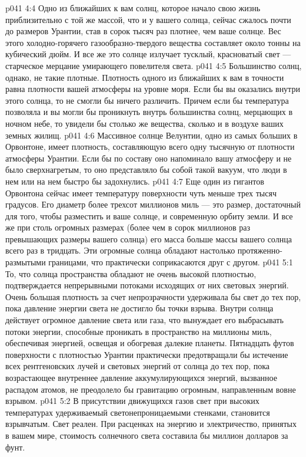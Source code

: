 \vs p041 4:4 Одно из ближайших к вам солнц, которое начало свою жизнь приблизительно с той же массой, что и у вашего солнца, сейчас сжалось почти до размеров Урантии, став в сорок тысяч раз плотнее, чем ваше солнце. Вес этого холодно\hyp{}горячего газообразно\hyp{}твердого вещества составляет около тонны на кубический дюйм. И все же это солнце излучает тусклый, красноватый свет --- старческое мерцание умирающего повелителя света.
\vs p041 4:5 Большинство солнц, однако, не такие плотные. Плотность одного из ближайших к вам в точности равна плотности вашей атмосферы на уровне моря. Если бы вы оказались внутри этого солнца, то не смогли бы ничего различить. Причем если бы температура позволяла и вы могли бы проникнуть внутрь большинства солнц, мерцающих в ночном небе, то увидели бы столько же вещества, сколько и в воздухе ваших земных жилищ.
\vs p041 4:6 Массивное солнце Велунтии, одно из самых больших в Орвонтоне, имеет плотность, составляющую всего одну тысячную от плотности атмосферы Урантии. Если бы по составу оно напоминало вашу атмосферу и не было сверхнагретым, то оно представляло бы собой такой вакуум, что люди в нем или на нем быстро бы задохнулись.
\vs p041 4:7 Еще один из гигантов Орвонтона сейчас имеет температуру поверхности чуть меньше трех тысяч градусов. Его диаметр более трехсот миллионов миль --- это размер, достаточный для того, чтобы разместить и ваше солнце, и современную орбиту земли. И все же при столь огромных размерах (более чем в сорок миллионов раз превышающих размеры вашего солнца) его масса больше массы вашего солнца всего раз в тридцать. Эти огромные солнца обладают настолько протяженно\hyp{}размытыми границами, что практически соприкасаются друг с другом.
\vs p041 5:1 То, что солнца пространства обладают не очень высокой плотностью, подтверждается непрерывными потоками исходящих от них световых энергий. Очень большая плотность за счет непрозрачности удерживала бы свет до тех пор, пока давление энергии света не достигло бы точки взрыва. Внутри солнца действует огромное давление света или газа, что вынуждает его выбрасывать потоки энергии, способные проникать в пространство на миллионы миль, обеспечивая энергией, освещая и обогревая далекие планеты. Пятнадцать футов поверхности с плотностью Урантии практически предотвращали бы истечение всех рентгеновских лучей и световых энергий от солнца до тех пор, пока возрастающее внутреннее давление аккумулирующихся энергий, вызванное распадом атомов, не преодолело бы гравитацию огромным, направленным вовне взрывом.
\vs p041 5:2 В присутствии движущихся газов свет при высоких температурах удерживаемый светонепроницаемыми стенками, становится взрывчатым. Свет реален. При расценках на энергию и электричество, принятых в вашем мире, стоимость солнечного света составила бы миллион долларов за фунт.
